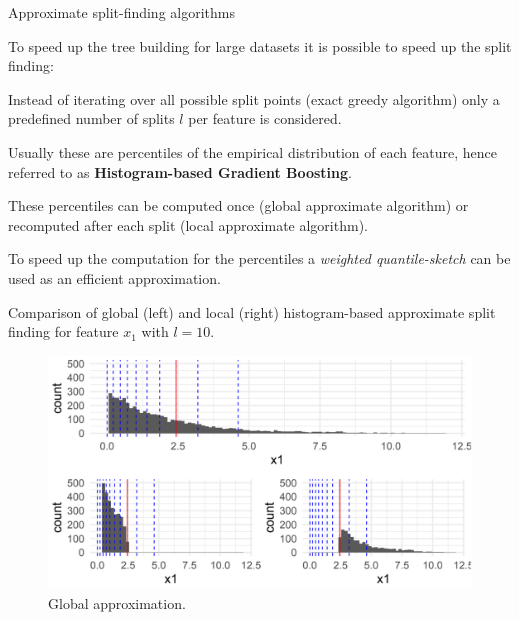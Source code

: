 \begin{vbframe}{Approximate split-finding algorithms}

  To speed up the tree building for large datasets it is possible to speed up the split finding:

  \lz

  Instead of iterating over all possible split points (exact greedy algorithm) only a predefined number of splits $l$ per feature is considered.

  \lz

  Usually these are percentiles of the empirical distribution of each feature, hence referred to as \textbf{Histogram-based Gradient Boosting}.

  \lz

  These percentiles can be computed once (global approximate algorithm) or recomputed after each split (local approximate algorithm).

  \lz

  To speed up the computation for the percentiles a \emph{weighted quantile-sketch} can be used as an efficient approximation.


  \framebreak

  Comparison of global (left) and local (right) histogram-based approximate split finding for feature $x_1$ with $l=10$.

  \lz

  \begin{small}
    \begin{minipage}[b]{0.49\textwidth}
      \begin{figure}
        \includegraphics[width=\textwidth]{figure_man/split-finding01.png}
        \caption*{Global approximation.}
      \end{figure}


\end{minipage}
\end{small}
\end{vbframe}
